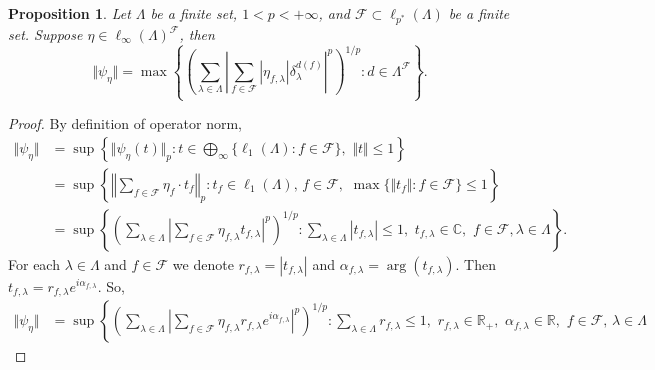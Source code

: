 \documentclass[12pt]{article}
\newtheorem{proposition}[theorem]{Proposition}
\begin{document}
\begin{proposition}\label{ExtMorphNorm}
    Let $\Lambda$ be a finite set, $1<p<+\infty$, 
    and $\mathcal{F}\subset\ell_{p^*}(\Lambda)$ be a finite set. 
    Suppose $\eta\in\ell_\infty(\Lambda)^\mathcal{F}$, then 
    \[
        \Vert \psi_{\eta}\Vert
        =\max\left\{
            \left(\sum_{\lambda\in\Lambda}
                \left|
                    \sum_{f\in\mathcal{F}} |\eta_{f,\lambda}| 
                    \delta_{\lambda}^{d(f)}
                \right|^p
            \right)^{1/p} : 
            d\in\Lambda^\mathcal{F}
        \right\}.
    \]
\end{proposition}
\begin{proof}
    By definition of operator norm,
    \[
    \begin{aligned}
        \Vert\psi_{\eta}\Vert
        &=\sup\left\{
            \Vert\psi_{\eta}(t)\Vert_p:
            t\in \bigoplus_\infty\{\ell_1(\Lambda):f\in\mathcal{F}\},\,\,
            \Vert t\Vert\leq 1
        \right\} \\
        &=\sup\left\{
            \left \Vert\sum_{f\in\mathcal{F}}\eta_f\cdot t_f\right \Vert_p:
            t_f\in\ell_1(\Lambda),\, f\in\mathcal{F},\,\,
            \max\{\Vert t_f\Vert:f\in\mathcal{F}\}\leq 1
        \right\} \\
        &=\sup\left\{
            \left(\sum_{\lambda\in\Lambda}
                \left|
                    \sum_{f\in\mathcal{F}}\eta_{f,\lambda} t_{f,\lambda}
                \right|^p
            \right)^{1/p}:
            \sum_{\lambda\in\Lambda} |t_{f,\lambda}|\leq 1,\,\, 
            t_{f,\lambda}\in\mathbb{C},\,\, f\in\mathcal{F}, \lambda\in\Lambda
        \right\}.
    \end{aligned}
    \]
    For each $\lambda\in\Lambda$ and $f\in\mathcal{F}$ we 
    denote $r_{f,\lambda}=|t_{f,\lambda}|$ 
    and $\alpha_{f,\lambda}=\operatorname{arg}(t_{f,\lambda})$. 
    Then $t_{f,\lambda}=r_{f,\lambda} e^{i \alpha_{f,\lambda}}$. So,
    \[
    \begin{aligned}
        \Vert \psi_{\eta}\Vert
        &=\sup\left\{
            \left(\sum_{\lambda\in\Lambda}
                \left|
                    \sum_{f\in\mathcal{F}}
                        \eta_{f,\lambda} r_{f,\lambda} e^{i \alpha_{f,\lambda}}
                \right|^p
            \right)^{1/p}:
            \sum_{\lambda\in\Lambda} r_{f,\lambda}\leq 1,\,\, 
            r_{f,\lambda}\in\mathbb{R}_+,\,\, 
            \alpha_{f,\lambda}\in\mathbb{R},\,\, 
            f\in\mathcal{F},\, \lambda\in\Lambda

\end{aligned}\]
\end{proof}
\end{document}
